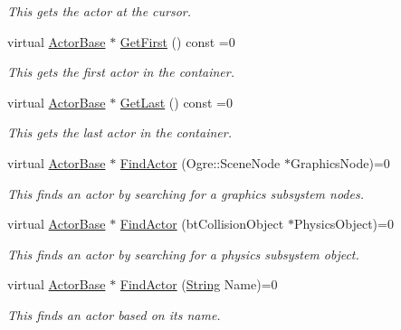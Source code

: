 \begin{DoxyCompactItemize}
\begin{DoxyCompactList}\small\item\em This gets the actor at the cursor. \item\end{DoxyCompactList}\item 
virtual \hyperlink{classphys_1_1ActorBase}{ActorBase} $\ast$ \hyperlink{classphys_1_1ActorContainerBase_ae703482d84a9c6726e28a8f26418b161}{GetFirst} () const =0
\begin{DoxyCompactList}\small\item\em This gets the first actor in the container. \item\end{DoxyCompactList}\item 
virtual \hyperlink{classphys_1_1ActorBase}{ActorBase} $\ast$ \hyperlink{classphys_1_1ActorContainerBase_a8efeffd5ae22085fe01af791b3ea559e}{GetLast} () const =0
\begin{DoxyCompactList}\small\item\em This gets the last actor in the container. \item\end{DoxyCompactList}\item 
virtual \hyperlink{classphys_1_1ActorBase}{ActorBase} $\ast$ \hyperlink{classphys_1_1ActorContainerBase_a1ade0001858f87ce1843cc6f6ec4e1c0}{FindActor} (Ogre::SceneNode $\ast$GraphicsNode)=0
\begin{DoxyCompactList}\small\item\em This finds an actor by searching for a graphics subsystem nodes. \item\end{DoxyCompactList}\item 
virtual \hyperlink{classphys_1_1ActorBase}{ActorBase} $\ast$ \hyperlink{classphys_1_1ActorContainerBase_a9ba6e38e0f12ada968cfee72fe5144d4}{FindActor} (btCollisionObject $\ast$PhysicsObject)=0
\begin{DoxyCompactList}\small\item\em This finds an actor by searching for a physics subsystem object. \item\end{DoxyCompactList}\item 
virtual \hyperlink{classphys_1_1ActorBase}{ActorBase} $\ast$ \hyperlink{classphys_1_1ActorContainerBase_a91223cbaebb8e5f11a4f971d7e5b64b6}{FindActor} (\hyperlink{namespacephys_aa03900411993de7fbfec4789bc1d392e}{String} Name)=0
\begin{DoxyCompactList}\small\item\em This finds an actor based on its name. \item\end{DoxyCompactList}\item 

\end{DoxyCompactItemize}
